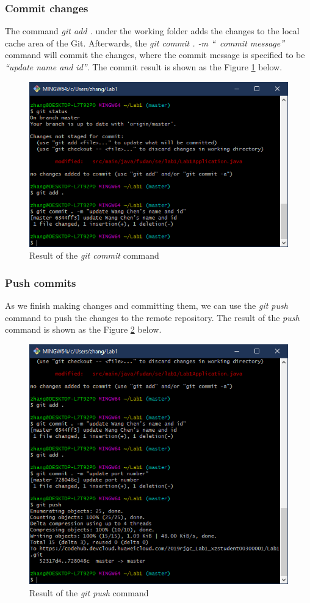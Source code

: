 \documentclass[a4paper]{report}
\begin{document}
\subsubsection{Commit changes}
The command \emph{git add .} under the working folder adds the changes to the local cache area of the Git. Afterwards, the \emph{git commit . -m ``~commit message''} command will commit the changes, where the commit message is specified to be \emph{``update name and id''}. The commit result is shown as the Figure \ref{5} below.
\begin{figure}
  \centering
  \includegraphics[width=12cm]{Figures/Capture2.png}
  \caption{Result of the \emph{git commit} command}\label{5}
\end{figure}
\subsubsection{Push commits}
As we finish making changes and committing them, we can use the \emph{git push} command to push the changes to the remote repository. The result of the \emph{push} command is shown as the Figure \ref{6} below.
\begin{figure}
  \centering
  \includegraphics[width=12cm]{Figures/Capture5.png}
  \caption{Result of the \emph{git push} command}\label{6}
\end{figure}
\end{document}
